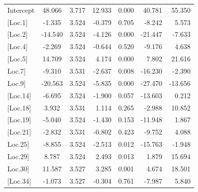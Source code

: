 \begin{longtable}{@{\extracolsep{\fill}}p{2.8cm}clrrrr@{}}
	Intercept    & 48.066  & 3.717 & 12.933 & 0.000 & 40.781  & 55.350  \\
	{[}Loc.1{]}  & -1.335  & 3.524 & -0.379 & 0.705 & -8.242  & 5.573   \\
	\setrow{\bfseries} {[}Loc.2{]}  & \setrow{\bfseries} -14.540 & \setrow{\bfseries} 3.524 & \setrow{\bfseries} -4.126 & \setrow{\bfseries} 0.000 & \setrow{\bfseries} -21.447 & \setrow{\bfseries} -7.633  \\
	{[}Loc.4{]}  & -2.269  & 3.524 & -0.644 & 0.520 & -9.176  & 4.638   \\
	\setrow{\bfseries} {[}Loc.5{]}  & \setrow{\bfseries} 14.709  & \setrow{\bfseries} 3.524 & \setrow{\bfseries} 4.174  & \setrow{\bfseries} 0.000 & \setrow{\bfseries} 7.802   & \setrow{\bfseries} 21.616  \\
	 \setrow{\bfseries}{[}Loc.7{]}  & \setrow{\bfseries} -9.310  & \setrow{\bfseries} 3.531 & \setrow{\bfseries} -2.637 & \setrow{\bfseries} 0.008 & \setrow{\bfseries} -16.230 & \setrow{\bfseries} -2.390  \\
	 \setrow{\bfseries}{[}Loc.9{]}  & \setrow{\bfseries} -20.563 & \setrow{\bfseries} 3.524 & \setrow{\bfseries} -5.835 & \setrow{\bfseries} 0.000 & \setrow{\bfseries} -27.470 & \setrow{\bfseries} -13.656 \\
	{[}Loc.14{]} & -6.695  & 3.524 & -1.900 & 0.057 & -13.603 & 0.212   \\
	{[}Loc.18{]} & 3.932   & 3.531 & 1.114  & 0.265 & -2.988  & 10.852  \\
	{[}Loc.19{]} & -5.040  & 3.524 & -1.430 & 0.153 & -11.948 & 1.867   \\
	{[}Loc.21{]} & -2.832  & 3.531 & -0.802 & 0.423 & -9.752  & 4.088   \\
	 \setrow{\bfseries}{[}Loc.25{]} & \setrow{\bfseries} -8.855  & \setrow{\bfseries} 3.524 & \setrow{\bfseries} -2.513 & \setrow{\bfseries} 0.012 & \setrow{\bfseries} -15.763 & \setrow{\bfseries} -1.948  \\
	 \setrow{\bfseries}{[}Loc.29{]} & \setrow{\bfseries} 8.787   & \setrow{\bfseries} 3.524 & \setrow{\bfseries} 2.493  & \setrow{\bfseries} 0.013 & \setrow{\bfseries} 1.879   & \setrow{\bfseries} 15.694  \\
	 \setrow{\bfseries}{[}Loc.30{]} & \setrow{\bfseries} 11.587  & \setrow{\bfseries} 3.527 & \setrow{\bfseries} 3.285  & \setrow{\bfseries} 0.001 & \setrow{\bfseries} 4.674   & \setrow{\bfseries} 18.501  \\
	{[}Loc.34{]} & -1.073  & 3.527 & -0.304 & 0.761 & -7.987  & 5.840   \\

\end{longtable}
